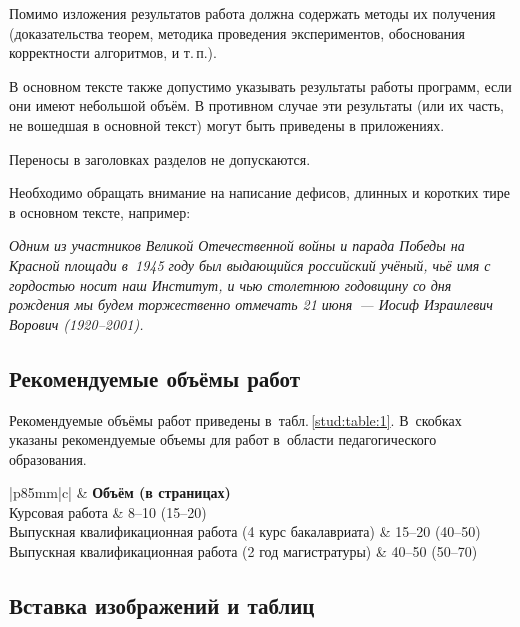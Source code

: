 \documentclass[14pt]{mmcs_article}
\begin{document}
Помимо изложения результатов работа должна содержать методы их получения (доказательства теорем, методика проведения экспериментов, обоснования корректности алгоритмов, и т.\,п.).

В основном тексте также допустимо указывать результаты работы программ, если они имеют небольшой объём. В противном случае эти результаты (или их часть, не вошедшая в основной текст) могут быть приведены в приложениях.

Переносы в заголовках разделов не допускаются.

Необходимо обращать внимание на написание дефисов, длинных и коротких тире в основном тексте, например:

\emph{Одним из участников Великой Отечественной войны и парада Победы на Красной площади в~1945 году был выдающийся российский учёный, чьё имя с гордостью носит наш Институт, и чью столетнюю годовщину со дня рождения мы будем торжественно отмечать 21 июня~--- Иосиф Израилевич Ворович (1920--2001).}


\subsection{Рекомендуемые объёмы работ}

Рекомендуемые объёмы работ приведены в~табл.\,\ref{stud:table:1}. В~скобках указаны рекомендуемые объемы для работ в~области педагогического образования.

\begin{table}[H]
  \centering

\caption{Рекомендуемые объёмы работ}\label{stud:table:1}

\begin{tabular}{|p{85mm}|c|}
  \hline
   &
   {\bf Объём (в страницах)} \\
  \hline
Курсовая работа	& 8--10 (15--20) \\
  \hline
Выпускная квалификационная работа\newline
(4 курс бакалавриата)	&  15--20 (40--50)\\
\hline
Выпускная квалификационная работа\newline
(2 год магистратуры)	&  40--50 (50--70) \\
\hline
\end{tabular}
\end{table}



\subsection{Вставка изображений и таблиц}
\end{document}
